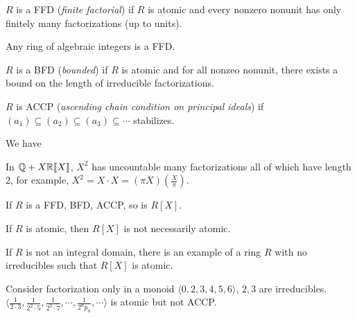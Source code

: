 \begin{definition}
    $R$ is a FFD (\emph{finite factorial}) if $R$ is atomic and every nonzero nonunit has only finitely many factorizations (up to units).
\end{definition}

\begin{example}
    Any ring of algebraic integers is a FFD.
\end{example}

\begin{definition}
    $R$ is a BFD (\emph{bounded}) if $R$ is atomic and for all nonzeo nonunit, there exists a bound on the length of irreducible factorizations. 
\end{definition}

\begin{definition}
    $R$ is ACCP (\emph{ascending chain condition on principal ideals}) if $(a_1) \subseteq (a_2) \subseteq (a_3) \subseteq \cdots$ stabilizes.
\end{definition}

\begin{proposition}
    We have 
    \begin{center} 
    \end{center}


\end{proposition}

\begin{example}
    In $\mathbb{Q}+X\mathbb{R}\llbracket X \rrbracket$, $X^{2}$ has uncountable many factorizations all of which have length 2, for example, $X^{2} = X \cdot X = (\pi X)(\frac{X}{\pi})$. 
\end{example}

\begin{fact}
    If $R$ is a FFD, BFD, ACCP, so is $R[X]$.
\end{fact}

\begin{fact}
    If $R$ is atomic, then $R[X]$ is not necessarily atomic.
\end{fact}

\begin{fact}
    If $R$ is not an integral domain, there is an example of a ring $R$ with no irreducibles such that $R[X]$ is atomic.
\end{fact}

\begin{example}
    Consider factorization only in a monoid $\langle 0,2,3,4,5,6 \rangle$, $2,3$ are irreducibles. $\langle \frac{1}{2 \cdot 3}, \frac{1}{2^{2} \cdot 5}, \frac{1}{2^{3} \cdot 7},\cdots,\frac{1}{2^{n}p_n}, \cdots \rangle$ is atomic but not ACCP.
\end{example}
